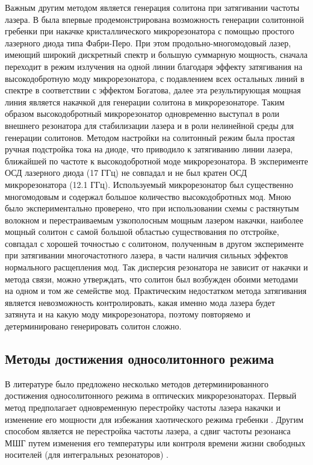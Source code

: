 Важным другим методом является генерация солитона при затягивании частоты лазера. В \cite{Pavlov2018} была впервые продемонстрирована возможность генерации солитонной гребенки при накачке кристаллического микрорезонатора с помощью простого лазерного диода типа Фабри-Перо. При этом продольно-многомодовый лазер, имеющий широкий дискретный спектр и большую суммарную мощность, сначала переходит в режим излучения на одной линии благодаря эффекту затягивания на высокодобротную моду микрорезонатора, с подавлением всех остальных линий в спектре в соответствии с эффектом Богатова, далее эта результирующая мощная линия является накачкой для генерации солитона в микрорезонаторе. Таким образом высокодобротный микрорезонатор одновременно выступал в роли внешнего резонатора для стабилизации лазера и в роли нелинейной среды для генерации солитонов. Методом настройки на солитонный режим была простая ручная подстройка тока на диоде, что приводило к затягиванию линии лазера, ближайшей по частоте к высокодобротной моде микрорезонатора. В эксперименте ОСД лазерного диода (17 ГГц) не совпадал и не был кратен ОСД микрорезонатора (12.1 ГГц). Используемый микрорезонатор был существенно многомодовым и содержал большое количество высокодобротных мод. Мною было экспериментально проверено, что при использовании схемы с растянутым волокном и перестраиваемым узкополосным мощным лазером накачки, наиболее мощный солитон с самой большой областью существования по отстройке, совпадал с хорошей точностью с солитоном, полученным в другом эксперименте при затягивании многочастотного лазера, в части наличия сильных эффектов нормального расщепления мод. Так дисперсия резонатора не зависит от накачки и метода связи, можно утверждать, что солитон был возбужден обоими методами на одном и том же семействе мод. Практическим недостатком метода затягивания является невозможность контролировать, какая именно мода лазера будет затянута и на какую моду микрорезонатора, поэтому повторяемо и детерминировано генерировать солитон сложно.


\subsection{Методы достижения односолитонного режима}

В литературе было предложено несколько методов детерминированного достижения односолитонного режима в оптических микрорезонаторах. Первый метод предполагает одновременную перестройку частоты лазера накачки и изменение его мощности для избежания хаотического режима гребенки \cite{Jaramillo2015}. Другим способом является не перестройка частоты лазера, а сдвиг частоты резонанса МШГ путем изменения его температуры \cite{Joshi2016} или контроля времени жизни свободных носителей (для интегральных резонаторов) \cite{Yu2016}.

